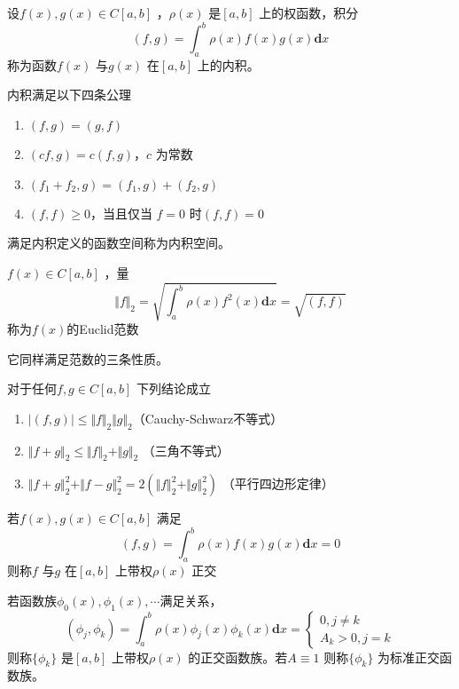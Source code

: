 \documentclass[a4paper]{article}
\begin{document}
\begin{definition}
	设$f(x), g(x) \in C[a,b]$ ，$\rho(x)$ 是$[a,b]$ 上的权函数，积分
	\[
		(f,g) = \int_{a}^{b} \rho(x) f(x) g(x) \mathbf{d} x 
	\] 
	称为函数$f(x)$ 与$g(x)$ 在$[a,b]$ 上的内积。
\end{definition}

内积满足以下四条公理
\begin{enumerate}
	\item $(f,g) = (g,f)$
	\item  $(cf,g) = c(f,g)$，$c$ 为常数
	\item $(f_1 + f_2, g) = (f_1, g) + (f_2, g)$
	\item $(f,f) \ge 0$，当且仅当 $f=0$ 时$(f,f) = 0$
\end{enumerate}
满足内积定义的函数空间称为内积空间。

\begin{definition}
	$f(x) \in C[a,b]$ ，量
	\[
	\Vert f \Vert_2 = \sqrt{\int_{a}^{b} \rho(x) f^2(x) \mathbf{d} x } = \sqrt{(f,f)} 
	\] 
	称为$f(x)$的Euclid范数
\end{definition}
它同样满足范数的三条性质。

\begin{theorem}
	对于任何$f,g \in C[a,b]$ 下列结论成立
	\begin{enumerate}
		\item $|(f,g)| \le \Vert f \Vert_2 \Vert g \Vert_2$（Cauchy-Schwarz不等式） 
		\item $\Vert f + g \Vert_2 \le \Vert f \Vert_2 + \Vert g \Vert_2$ （三角不等式）
		\item $\Vert f + g \Vert_2^2 + \Vert f - g \Vert_2^2 = 2 (\Vert f \Vert_2^2 + \Vert g \Vert_2^2)$ （平行四边形定律）
	\end{enumerate}
\end{theorem}

\begin{definition}
	若$f(x), g(x) \in C[a,b]$ 满足
	\[
		(f,g) = \int_{a}^{b} \rho(x) f(x) g(x) \mathbf{d} x = 0
	\] 
	则称$f$ 与$g$ 在$[a,b]$ 上带权$\rho(x)$ 正交
\end{definition}
若函数族$\phi_0(x), \phi_1(x), \cdots$满足关系，
\[
	(\phi_j, \phi_k) = \int_{a}^{b} \rho(x) \phi_j(x) \phi_k(x) \mathbf{d} x = 
	\begin{cases}
		0, j \neq k \\
		A_k > 0, j = k
	\end{cases}
\] 
则称$\{\phi_k\}$ 是$[a,b]$ 上带权$\rho(x)$ 的正交函数族。若$A \equiv 1$ 则称$\{\phi_k\}$ 为标准正交函数族。
\end{document}
